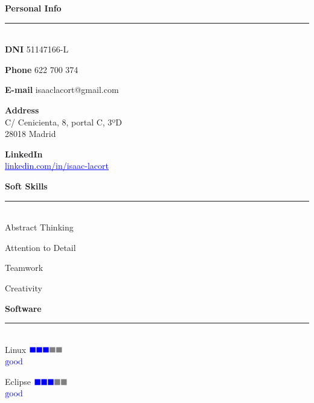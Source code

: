 \documentclass{article}
\begin{document}
\begin{minipage}[t]{0.3\linewidth}
  
  \setlength{\parskip}{0.3em}
  \textbf{\Large{\color{BlueViolet}Personal Info}}\\[-0.25cm]
  {\color{BlueViolet} \rule{\linewidth}{0.1mm} } \\[-0.25cm]
  \textbf{\large{DNI}} \hfill 51147166-L
  \vspace{0.1cm}
  
  \textbf{\large{Phone}} \hfill 622 700 374
  \vspace{0.1cm}

  \textbf{\large{E-mail}} \hfill isaaclacort@gmail.com
  \vspace{0.1cm}

  \textbf{\large{Address}}\\  
  \normalsize C/ Cenicienta, 8, portal C, 3ºD \\[0.06cm]
  \normalsize 28018 Madrid
  \vspace{0.1cm}
  
  \textbf{\large{LinkedIn}}\\
  \href{https://www.linkedin.com/in/isaac-lacort-706725168/}{\textcolor{blue}{\underline{linkedin.com/in/isaac-lacort}}}
  
  \vspace{0.3cm}
  \textbf{\Large{\color{BlueViolet}Soft Skills}}\\[-0.25cm]
  {\color{BlueViolet} \rule{\linewidth}{0.1mm} }\\[-0.25cm]
  Abstract Thinking 

  Attention to Detail

  Teamwork

  Creativity
  
  \vspace{0.3cm}
  \textbf{\Large{\color{BlueViolet}Software}}\\[-0.25cm]
  {\color{BlueViolet} \rule{\linewidth}{0.1mm} }\\
  \large Linux \hfill $\color{blue} \blacksquare\color{blue} \blacksquare \color{blue} \blacksquare \color{gray} \blacksquare  \color{gray} \blacksquare$  \\[-0.8mm]
  \null\hfill \small{ $\color{blue} \textnormal{good}$}

  \large Eclipse \hfill $\color{blue} \blacksquare\color{blue} \blacksquare \color{blue} \blacksquare \color{gray} \blacksquare  \color{gray} \blacksquare$  \\[-0.8mm]
  \null\hfill \small{ $\color{blue} \textnormal{good}$}


\end{minipage}
\end{document}
